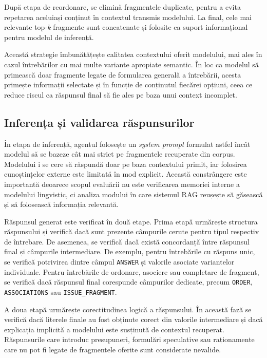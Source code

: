 \documentclass[12pt, a4paper, oneside, romanian]{teza-upb}
\begin{document}
După etapa de reordonare, se elimină fragmentele duplicate, pentru a evita repetarea aceluiași conținut în contextul transmis modelului. La final, cele mai relevante top-\textit{k} fragmente sunt concatenate și folosite ca suport informațional pentru modelul de inferență.

Această strategie îmbunătățește calitatea contextului oferit modelului, mai ales în cazul întrebărilor cu mai multe variante apropiate semantic. În loc ca modelul să primească doar fragmente legate de formularea generală a întrebării, acesta primește informații selectate și în funcție de conținutul fiecărei opțiuni, ceea ce reduce riscul ca răspunsul final să fie ales pe baza unui context incomplet.

\subsection{Inferența și validarea răspunsurilor}

În etapa de inferență, agentul folosește un \textit{system prompt} formulat astfel încât modelul să se bazeze cât mai strict pe fragmentele recuperate din corpus. Modelului i se cere să răspundă doar pe baza contextului primit, iar folosirea cunoștințelor externe este limitată în mod explicit. Această constrângere este importantă deoarece scopul evaluării nu este verificarea memoriei interne a modelului lingvistic, ci analiza modului în care sistemul RAG reușește să găsească și să folosească informația relevantă.


Răspunsul generat este verificat în două etape. Prima etapă urmărește structura răspunsului și verifică dacă sunt prezente câmpurile cerute pentru tipul respectiv de întrebare. De asemenea, se verifică dacă există concordanță între răspunsul final și câmpurile intermediare. De exemplu, pentru întrebările cu răspuns unic, se verifică potrivirea dintre câmpul \texttt{ANSWER} și valorile asociate variantelor individuale. Pentru întrebările de ordonare, asociere sau completare de fragment, se verifică dacă răspunsul final corespunde câmpurilor dedicate, precum \texttt{ORDER}, \texttt{ASSOCIATIONS} sau \texttt{ISSUE\_FRAGMENT}.


A doua etapă urmărește corectitudinea logică a răspunsului. În această fază se verifică dacă literele finale au fost obținute corect din valorile intermediare și dacă explicația implicită a modelului este susținută de contextul recuperat. Răspunsurile care introduc presupuneri, formulări speculative sau raționamente care nu pot fi legate de fragmentele oferite sunt considerate nevalide.
\end{document}
